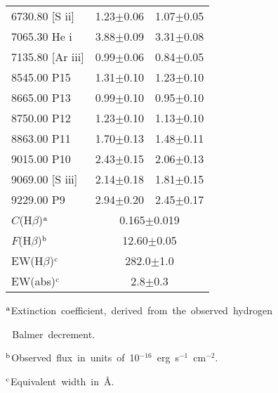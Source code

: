 \begin{table}
\begin{tabular}{lrr}
6730.80 [S {\sc ii}]            &  1.23$\pm$0.06&  1.07$\pm$0.05\\
7065.30 He {\sc i}              &  3.88$\pm$0.09&  3.31$\pm$0.08\\
7135.80 [Ar {\sc iii}]          &  0.99$\pm$0.06&  0.84$\pm$0.05\\
8545.00 P15                     &  1.31$\pm$0.10&  1.23$\pm$0.10\\
8665.00 P13                     &  0.99$\pm$0.10&  0.95$\pm$0.10\\
8750.00 P12                     &  1.23$\pm$0.10&  1.13$\pm$0.10\\
8863.00 P11                     &  1.70$\pm$0.13&  1.48$\pm$0.11\\
9015.00 P10                     &  2.43$\pm$0.15&  2.06$\pm$0.13\\
9069.00 [S {\sc iii}]           &  2.14$\pm$0.18&  1.81$\pm$0.15\\
9229.00 P9                      &  2.94$\pm$0.20&  2.45$\pm$0.17\\
$C$(H$\beta$)$^{\rm a}$         &\multicolumn{2}{c}{0.165$\pm$0.019}\\
$F$(H$\beta$)$^{\rm b}$         &\multicolumn{2}{c}{12.60$\pm$0.05}\\
EW(H$\beta$)$^{\rm c}$          &\multicolumn{2}{c}{282.0$\pm$1.0}\\
EW(abs)$^{\rm c}$               &\multicolumn{2}{c}{2.8$\pm$0.3}\\
\hline
  \end{tabular}

\hbox{$^{\rm a}$Extinction coefficient, derived from the observed hydrogen} 

\hbox{\,~Balmer decrement.}

\hbox{$^{\rm b}$Observed flux in units of 10$^{-16}$ erg s$^{-1}$ cm$^{-2}$.}

\hbox{$^{\rm c}$Equivalent width in \AA.}

  \end{table}
